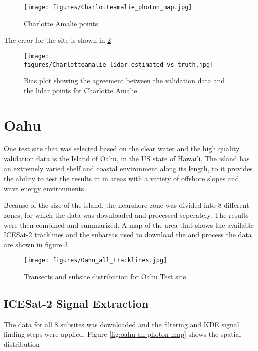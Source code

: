 \begin{figure}[h]
    \centering
    \texttt{[image: figures/Charlotteamalie\_photon\_map.jpg]}
    \caption{Charlotte Amalie points}
    \label{fig:point-map-charlotteamalie}
\end{figure}

The error for the site is shown in \ref{fig:charlotteamalie-lidar-bias}

\begin{figure}[h]
    \centering
    \texttt{[image: figures/Charlotteamalie\_lidar\_estimated\_vs\_truth.jpg]}
    \caption{Bias plot showing the agreement between the validation data and the lidar points for Charlotte Amalie}
    \label{fig:charlotteamalie-lidar-bias}
\end{figure}


\section{Oahu}
One test site that was selected based on the clear water and the high quality validation data is the Island of Oahu, in the US state of Hawai'i. The island has an extremely varied shelf and coastal environment along its length, to it provides the ability to test the results in in areas with a variety of offshore slopes and wave energy environments.

Because of the size of the island, the nearshore zone was divided into 8 different zones, for which the data was downloaded and processed seperately. The results were then combined and summarized. A map of the area that shows the available ICESat-2 tracklines and the subareas used to download the and process the data are shown in figure \ref{fig:oahu-all-sites-transects}

\begin{figure}[h]
    \centering
    \texttt{[image: figures/Oahu\_all\_tracklines.jpg]}
    \caption{Transects and subsite distribution for Oahu Test site}
    \label{fig:oahu-all-sites-transects}
\end{figure}

\subsection{ICESat-2 Signal Extraction}

The data for all 8 subsites was downloaded and the filtering and KDE signal finding steps were applied. Figure \ref{fig:oahu-all-photon-map} shows the spatial distribution


